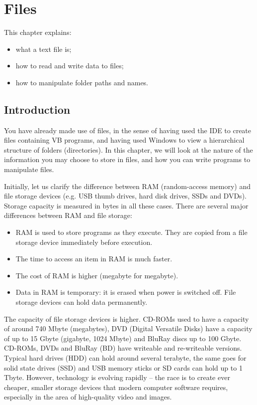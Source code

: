 \chapter{Files}
	\label{ch:files}

	This chapter explains:
	\begin{itemize}
    \item what a text file is;
    \item how to read and write data to files;
    \item how to manipulate folder paths and names.
	\end{itemize}

	\section{Introduction}
		You have already made use of files, in the sense of having used the IDE to create files containing VB programs, and having used Windows to view a hierarchical structure of folders (directories). In this chapter, we will look at the nature of the information you may choose to store in files, and how you can write programs to manipulate files.
		
		Initially, let us clarify the difference between RAM (random-access memory) and file storage devices (e.g. USB thumb drives, hard disk drives, SSDs and DVDs). Storage capacity is measured in bytes in all these cases. There are several major differences between RAM and file storage:
		\begin{itemize}
      \item RAM is used to store programs as they execute. They are copied from a file storage device immediately before execution.
      \item The time to access an item in RAM is much faster.
      \item The cost of RAM is higher (megabyte for megabyte).
      \item Data in RAM is temporary: it is erased when power is switched off. File storage devices can hold data permanently.
		\end{itemize}
		The capacity of file storage devices is higher. CD-ROMs used to have a capacity of around 740 Mbyte (megabytes), DVD (Digital Versatile Disks) have a capacity of up to 15 Gbyte (gigabyte, 1024 Mbyte) and BluRay discs up to 100 Gbyte. CD-ROMs, DVDs and BluRay (BD) have writeable and re-writeable versions. Typical hard drives (HDD) can hold around several terabyte, the same goes for solid state drives (SSD) and USB memory sticks or SD cards can hold up to 1 Tbyte. However, technology is evolving rapidly – the race is to create ever cheaper, smaller storage devices that modern computer software requires, especially in the area of high-quality video and images.


